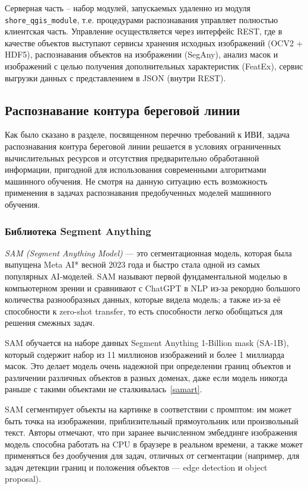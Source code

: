 \documentclass[732,14pt,final]{studrep}
\begin{document}
Серверная часть -- набор модулей, запускаемых удаленно из модуля \verb|shore_qgis_module|, т.е. процедурами распознавания управляет полностью   клиентская часть. Управление осуществляется через интерфейс REST, где в качестве объектов выступают сервисы хранения исходных изображений (OCV2 + HDF5), распознавания объектов на изображении (SegAny), анализ масок и изображений с целью получения дополнительных характеристик (FeatEx), сервис выгрузки данных с представлением в JSON (внутри REST).

\subsection{Распознавание контура береговой линии}

Как было сказано в разделе, посвященном перечню требований к ИВИ, задача распознавания контура береговой линии решается в условиях ограниченных вычислительных ресурсов и отсутствия предварительно обработанной информации, пригодной для использования современными алгоритмами машинного обучения. Не смотря на данную ситуацию есть возможность применения в задачах распознавания предобученных моделей машинного обучения. 

\subsubsection{Библиотека Segment Anything}
\label{sec:sam}

\emph{SAM (Segment Anything Model)} — это сегментационная модель, которая была выпущена Meta AI*  весной 2023 года и быстро стала одной из самых популярных AI-моделей. SAM называют первой фундаментальной моделью в компьютерном зрении и сравнивают с ChatGPT в NLP из-за рекордно большого количества разнообразных данных, которые видела модель; а также из-за её способности к zero-shot transfer, то есть способности легко обобщаться для решения смежных задач.

SAM обучается на наборе данных Segment Anything 1-Billion mask (SA-1B), который содержит набор из 11 миллионов изображений и более 1 миллиарда масок. Это делает модель очень надежной при определении границ объектов и различении различных объектов в разных доменах, даже если модель никогда раньше с такими объектами не сталкивалась~\ref{samart}.

SAM сегментирует объекты на картинке в соответствии с промптом: им может быть точка на изображении, приблизительный прямоугольник или произвольный текст. Авторы отмечают, что при заранее вычисленном эмбеддинге изображения модель способна работать на CPU в браузере в реальном времени, а также может применяться без дообучения для задач, отличных от сегментации (например, для задач детекции границ и положения объектов — edge detection и object proposal).
\end{document}
